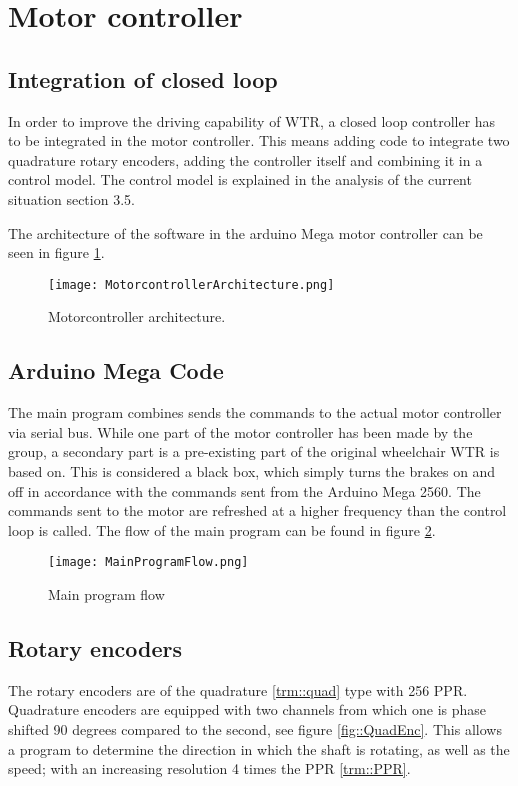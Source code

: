 \section{Motor controller}

\subsection{Integration of closed loop}
In order to improve the driving capability of WTR, a closed loop controller has to be integrated in the motor controller. 
This means adding code to integrate two quadrature rotary encoders, adding the controller itself and combining it in a control model.
The control model is explained in the analysis of the current situation section 3.5.

The architecture of the software in the arduino Mega motor controller can be seen in figure \ref{fig::Motorconarc}.

\begin{figure}[H]
\centering
\texttt{[image: MotorcontrollerArchitecture.png]}
\caption{Motorcontroller architecture.}
\label{fig::Motorconarc}
\end{figure}

\subsection{Arduino Mega Code}
The main program combines sends the commands to the actual motor controller via serial bus. 
While one part of the motor controller has been made by the group, a secondary part is a pre-existing part of the original wheelchair WTR is based on.
This is considered a black box, which simply turns the brakes on and off in accordance with the commands sent from the Arduino Mega 2560.
The commands sent to the motor are refreshed at a higher frequency than the control loop is called. %
The flow of the main program can be found in figure \ref{fig::MPF}.

\begin{figure}[H]
\centering
\texttt{[image: MainProgramFlow.png]}
\caption{Main program flow}
\label{fig::MPF}
\end{figure}


\subsection{Rotary encoders}
The rotary encoders are of the quadrature \ref{trm::quad} type with 256 PPR.
Quadrature encoders are equipped with two channels from which one is phase shifted 90 degrees compared to the second, see figure \ref{fig::QuadEnc}.
This allows a program to determine the direction in which the shaft is rotating, as well as the speed; with an increasing resolution 4 times the PPR \ref{trm::PPR}.

